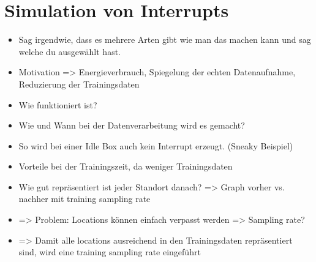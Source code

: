 \section{Simulation von Interrupts}
\begin{itemize}
    \item Sag irgendwie, dass es mehrere Arten gibt wie man das machen kann und sag welche du ausgewählt hast.
    \item Motivation => Energieverbrauch, Spiegelung der echten Datenaufnahme, Reduzierung der Trainingsdaten
    \item Wie funktioniert ist?
    \item Wie und Wann bei der Datenverarbeitung wird es gemacht?
    \item So wird bei einer Idle Box auch kein Interrupt erzeugt. (Sneaky Beispiel)
    \item Vorteile bei der Trainingszeit, da weniger Trainingsdaten
    \item Wie gut repräsentiert ist jeder Standort danach? => Graph vorher vs. nachher mit training sampling rate
    \item => Problem: Locations können einfach verpasst werden => Sampling rate?
    \item => Damit alle locations ausreichend in den Trainingsdaten repräsentiert sind, wird eine training sampling rate eingeführt
\end{itemize}